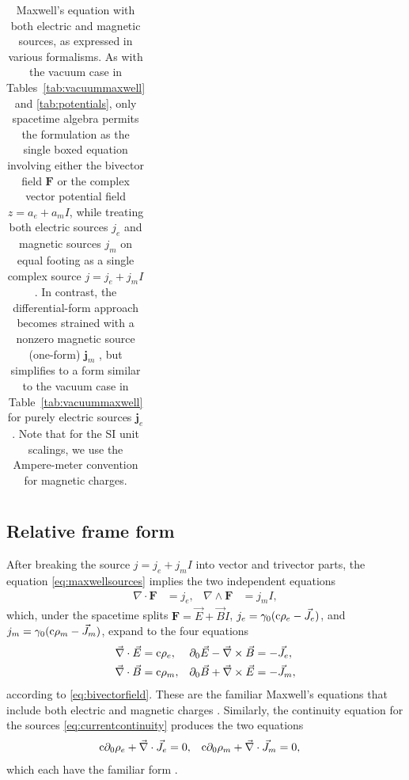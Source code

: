 \documentclass[1p,sort&compress]{elsarticle}
\numberwithin{equation}{section}
\newcommand{\rv}[1]{\vec{#1}}
\newcommand{\bv}[1]{\mathbf{#1}}
\newcommand{\cc}{{\rm c}}
\begin{document}
\begin{table}
\begin{tabular}{l l}
    \hline 
 \end{tabular}
 \caption[Maxwell's equation with sources]{Maxwell's equation with both electric and magnetic sources, as expressed in various formalisms.  As with the vacuum case in Tables~\ref{tab:vacuummaxwell} and \ref{tab:potentials}, only spacetime algebra permits the formulation as the single boxed equation involving either the bivector field $\bv{F}$ or the complex vector potential field $z = a_e + a_m I$, while treating both electric sources $j_e$ and magnetic sources $j_m$ on equal footing as a single complex source $j = j_e + j_m I$.  In contrast, the differential-form approach becomes strained with a nonzero magnetic source (one-form) $\bv{j}_m$ \cite{Cabibbo1962}, but simplifies to a form similar to the vacuum case in Table~\ref{tab:vacuummaxwell} for purely electric sources $\bv{j}_e$. Note that for the SI unit scalings, we use the Ampere-meter convention for magnetic charges. }
 \label{tab:sourcemaxwell}
\end{table}


\subsection{Relative frame form}


After breaking the source $j = j_e + j_m I$ into vector and trivector parts, the equation \eqref{eq:maxwellsources} implies the two independent equations
\begin{align}
  \nabla\cdot \bv{F} &= j_e, & \nabla\wedge \bv{F} &= j_m I,
\end{align}
which, under the spacetime splits $\bv{F} = \rv{E} + \rv{B}I$, $j_e = \gamma_0(\cc\rho_e - \rv{J}_e)$, and $j_m = \gamma_0(\cc\rho_m - \rv{J}_m)$, expand to the four equations
\begin{align}
  \rv{\nabla}\cdot\rv{E} &= \cc\rho_e, & \partial_0 \rv{E} - \rv{\nabla}\times\rv{B} &= - \rv{J}_e, \\
  \rv{\nabla}\cdot\rv{B} &= \cc\rho_m, & \partial_0 \rv{B} + \rv{\nabla}\times\rv{E} &= - \rv{J}_m, \nonumber
\end{align}
according to \eqref{eq:bivectorfield}.  These are the familiar Maxwell's equations that include both electric and magnetic charges \cite{Dirac1931,Dirac1948,Cabibbo1962,Schwinger1966b,Rohrlich1966,Zwanziger1968,Zwanziger1971,Han1971,Mignani1975,Deser1976,Deser1982,Gambini1979,
Gambini1980,Schwartz1994,Pasti1995,Singleton1995,Singleton1996,Khoudeir1996,Kato2002,Shnir2005}.  Similarly, the continuity equation for the sources \eqref{eq:currentcontinuity} produces the two equations
\begin{align}
  \cc\partial_0 \rho_e + \rv{\nabla}\cdot\rv{J}_e &= 0, & \cc\partial_0 \rho_m + \rv{\nabla}\cdot\rv{J}_m &= 0,
\end{align}
which each have the familiar form \cite{Jackson1999}.
\end{document}
